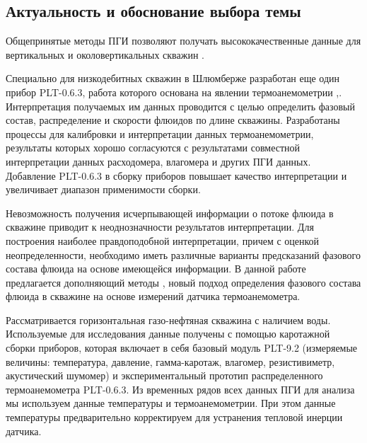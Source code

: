 \subsection{Актуальность и обоснование выбора темы}
\par
Общепринятые методы ПГИ позволяют получать высококачественные данные для вертикальных и околовертикальных скважин \cite{horizonal_1}.
\par
Специально для низкодебитных скважин в Шлюмберже разработан еще один прибор PLT-0.6.3, работа которого основана на явлении термоанемометрии \cite{horizonal_1},\cite{horizonal_2}. Интерпретация получаемых им данных проводится с целью определить фазовый состав, распределение и скорости флюидов по длине скважины. Разработаны процессы для калибровки и интерпретации данных термоанемометрии, результаты которых хорошо согласуются с результатами совместной интерпретации данных расходомера, влагомера и других ПГИ данных. Добавление PLT-0.6.3 в сборку приборов повышает качество интерпретации и увеличивает диапазон применимости сборки.
\par
Невозможность получения исчерпывающей информации о потоке флюида в скважине приводит к неоднозначности результатов интерпретации. Для построения наиболее правдоподобной интерпретации, причем с оценкой неопределенности, необходимо иметь различные варианты предсказаний фазового состава флюида на основе имеющейся информации. В данной работе предлагается дополняющий методы \cite{horizonal_1},\cite{horizonal_2} новый подход определения фазового состава флюида в скважине на основе измерений датчика термоанемометра. 
\par
Рассматривается горизонтальная газо-нефтяная скважина с наличием воды. Используемые для исследования данные получены с помощью каротажной сборки приборов, которая включает в себя базовый модуль PLT-9.2 (измеряемые величины: температура, давление, гамма-каротаж, влагомер, резистивиметр, акустический шумомер) и экспериментальный прототип распределенного термоанемометра PLT-0.6.3. Из временных рядов всех данных ПГИ для анализа мы используем данные температуры и термоанемометрии. При этом данные температуры предварительно корректируем для устранения тепловой инерции датчика.